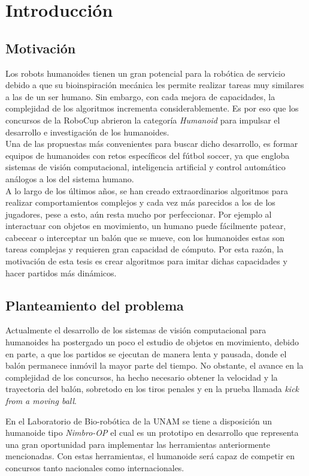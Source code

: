 \chapter{Introducción}

\section{Motivación}
	Los robots humanoides tienen un gran potencial para la robótica de servicio debido a que su bioinspiración mecánica les permite realizar tareas muy similares a las de un ser humano. Sin embargo, con cada mejora de capacidades, la complejidad de los algoritmos incrementa considerablemente. Es por eso que los concursos de la RoboCup abrieron la categoría \textit{Humanoid} para impulsar el desarrollo e investigación de los humanoides.
	\\
	Una de las propuestas más convenientes para buscar dicho desarrollo, es formar equipos de humanoides con retos específicos del fútbol soccer, ya que engloba sistemas de visión computacional, inteligencia artificial y control automático análogos a los del sistema humano.
	\\	
	A lo largo de los últimos años, se han creado extraordinarios algoritmos para realizar comportamientos complejos y cada vez más parecidos a los de los jugadores, pese a esto, aún resta mucho por perfeccionar. Por ejemplo al interactuar con objetos en movimiento, un humano puede fácilmente patear, cabecear o interceptar un balón que se mueve, con los humanoides estas son tareas complejas y requieren gran capacidad de cómputo. 
	Por esta razón, la motivación de esta tesis es crear algoritmos para imitar dichas capacidades y hacer partidos más dinámicos.
	
\section{Planteamiento del problema}
	Actualmente el desarrollo de los sistemas de visión computacional para humanoides ha postergado un poco el estudio de objetos en movimiento, debido en parte, a que los partidos se ejecutan de manera lenta y pausada, donde el balón permanece inmóvil la mayor parte del tiempo. No obstante, el avance en la complejidad de los concursos, ha hecho necesario obtener la velocidad y la trayectoria del balón, sobretodo en los tiros penales y en la prueba llamada \textit{kick from a moving ball}.  

	En el Laboratorio de Bio-robótica de la UNAM se tiene a disposición un humanoide tipo \textit{Nimbro-OP} el cual es un prototipo en desarrollo que representa una gran oportunidad para implementar las herramientas anteriormente mencionadas. Con estas herramientas, el humanoide será capaz de competir en concursos tanto nacionales como internacionales.
	 
